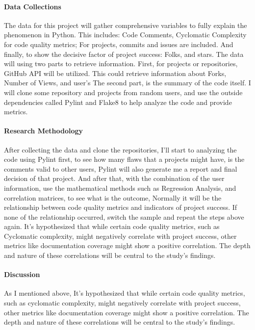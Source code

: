 \documentclass[12pt]{article}
\begin{document}
\paragraph{Data Collections}
The data for this project will gather comprehensive variables to fully explain the phenomenon in Python. This includes: Code Comments, Cyclomatic Complexity for code quality metrics; For projects, commits and issues are included. And finally, to show the decisive factor of project success: Folks, and stars. 
The data will using two parts to retrieve information. First, for projects or repositories, GitHub API will be utilized. This could retrieve information about Forks, Number of Views, and user's 
The second part, is the summary of the code itself. I will clone some repository and projects from random users, and use the outside dependencies called Pylint and Flake8 to help analyze the code and provide metrics.

\paragraph{Research Methodology}
After collecting the data and clone the repositories, I'll start to analyzing the code using Pylint first, to see how many flaws that a projects might have, is the comments valid to other users, Pylint will also generate me a report and final decision of that project. And after that, with the combination of the user information, use the mathematical methods such as Regression Analysis, and correlation matrices, to see what is the outcome, Normally it will be the relationship between code quality metrics and indicators of project success. If none of the relationship occurred, switch the sample and repeat the steps above again. 
It's hypothesized that while certain code quality metrics, such as Cyclomatic complexity, might negatively correlate with project success, other metrics like documentation coverage might show a positive correlation. The depth and nature of these correlations will be central to the study's findings.

\paragraph{Discussion}
As I mentioned above, It's hypothesized that while certain code quality metrics, such as cyclomatic complexity, might negatively correlate with project success, other metrics like documentation coverage might show a positive correlation. The depth and nature of these correlations will be central to the study's findings.



\cite{7816479}
\cite{7884605}
\end{document}
